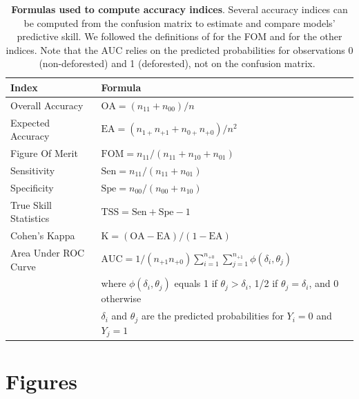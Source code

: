 \documentclass[12pt,]{article}
\begin{document}
\begin{table}[H]

\caption{\label{tab:accuracy-indices}\textbf{Formulas used to compute accuracy indices}. Several accuracy indices can be computed from the confusion matrix to estimate and compare models' predictive skill. We followed the definitions of \citet{Pontius2008} for the FOM and \citet{Liu2011} for the other indices. Note that the AUC relies on the predicted probabilities for observations 0 (non-deforested) and 1 (deforested), not on the confusion matrix.\vspace{0.5cm}~}
\centering
\begin{tabular}[t]{ll}
\toprule
Index & Formula\\
\midrule
\rowcolor{gray!6}  Overall Accuracy & $\text{OA} = (n_{11}+n_{00})/n$\\
Expected Accuracy & $\text{EA} = (n_{1+} n_{+1}+n_{0+} n_{+0})/n^2$\\
\rowcolor{gray!6}  Figure Of Merit & $\text{FOM} = n_{11}/(n_{11}+n_{10}+n_{01})$\\
Sensitivity & $\text{Sen} = n_{11}/(n_{11}+n_{01})$\\
\rowcolor{gray!6}  Specificity & $\text{Spe} = n_{00}/(n_{00}+n_{10})$\\
True Skill Statistics & $\text{TSS} = \text{Sen}+\text{Spe}-1$\\
\rowcolor{gray!6}  Cohen's Kappa & $\text{K} = (\text{OA}-\text{EA})/(1-\text{EA})$\\
Area Under ROC Curve & $\text{AUC} = 1/(n_{+1} n_{+0}) \sum_{i=1}^{n_{+0}} \sum_{j=1}^{n_{+1}} \phi(\delta_i,\theta_j)$\\
\rowcolor{gray!6}   & where $\phi(\delta_i,\theta_j)$ equals 1 if $\theta_j>\delta_i$, 1/2 if $\theta_j=\delta_i$, and 0 otherwise\\
 & $\delta_i$ and $\theta_j$ are the predicted probabilities for $Y_i=0$ and $Y_j=1$\\
\bottomrule
\end{tabular}
\end{table}

\newpage

\hypertarget{figures}{%
\section{Figures}\label{figures}}
\end{document}

